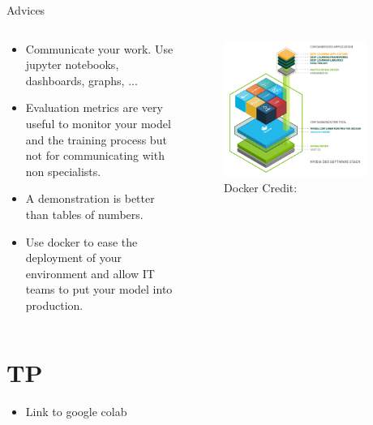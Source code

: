 \documentclass{beamer}
\begin{document}
\begin{frame}{Advices}
	\begin{columns}
		\begin{column}{0.6\textwidth}
			\begin{itemize}
				\item Communicate your work. Use jupyter notebooks, dashboards, graphs, ...
				\item Evaluation metrics are very useful to monitor your model and the training process but not for communicating with non specialists.
				\item A demonstration is better than tables of numbers.
				\item Use docker to ease the deployment of your environment and allow IT teams to put your model into production.
			\end{itemize}
		\end{column}
		\begin{column}{0.4\textwidth}
			\begin{figure}
				\centering
				\includegraphics[width=0.9\textwidth]{images/docker.png}
				\caption{Docker
				\hbox{\scriptsize Credit:}}
			\end{figure}
		\end{column}
	\end{columns}
\end{frame}


\part{TP}
\begin{frame}
	\partpage
\end{frame}


\begin{frame}{}
	\begin{itemize}
		\item Link to google colab
	\end{itemize}
\end{frame}

\begin{frame}[allowframebreaks]
    \printbibliography
\end{frame}
\end{document}
